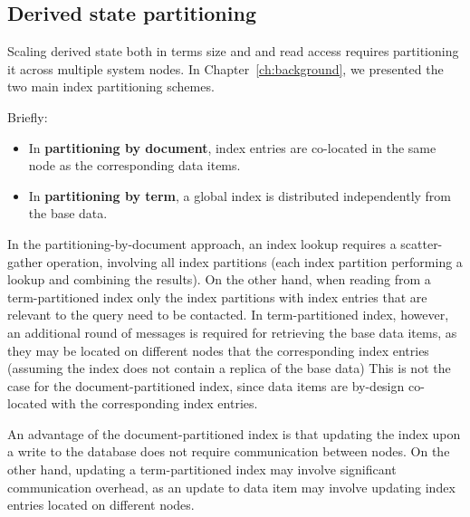 
\subsection{Derived state partitioning}
\label{sec:index_partitioning_design_space}


Scaling derived state both in terms size and and read access requires partitioning it across multiple system nodes.
In Chapter~\ref{ch:background}, we presented the two main index partitioning schemes.

Briefly:
\begin{itemize}
  \item In \textbf{partitioning by document}, index entries are co-located in the same node as the corresponding
  data items.
  \item In \textbf{partitioning by term}, a global index is distributed independently from the base data.
\end{itemize}


In the partitioning-by-document approach, an index lookup requires a scatter-gather operation,
involving all index partitions (each index partition performing a lookup and combining the results).
On the other hand, when reading from a term-partitioned index only the index partitions with index entries that are
relevant to the query need to be contacted.
In term-partitioned index, however, an additional round of messages is required for retrieving the base data items,
as they may be located on different nodes that the corresponding index entries (assuming the index does not contain a
replica of the base data)
This is not the case for the document-partitioned index, since data items are by-design co-located with the corresponding
index entries.

An advantage of the document-partitioned index is that updating the index upon a write to the database does not require
communication between nodes.
On the other hand, updating a term-partitioned index may involve significant communication overhead, as an update to data
item may involve updating index entries located on different nodes.

